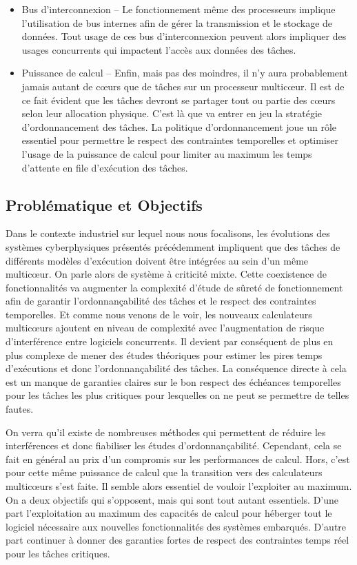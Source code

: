 \documentclass[french, a4paper, 11pt, twoside, pdftex]{StyleThese}
\begin{document}
\begin{itemize}
			\item Bus d'interconnexion -- 
				Le fonctionnement même des processeurs implique l'utilisation de bus internes afin de gérer la transmission et le stockage de données. Tout usage de ces bus d'interconnexion peuvent alors impliquer des usages concurrents qui impactent l'accès aux données des tâches.
			\item Puissance de calcul -- 
				Enfin, mais pas des moindres, il n'y aura probablement jamais autant de cœurs que de tâches sur un processeur multicœur. Il est de ce fait évident que les tâches devront se partager tout ou partie des cœurs selon leur allocation physique. C'est là que va entrer en jeu la stratégie d'ordonnancement des tâches. La politique d'ordonnancement joue un rôle essentiel pour permettre le respect des contraintes temporelles et optimiser l'usage de la puissance de calcul pour limiter au maximum les temps d'attente en file d'exécution des tâches. 
		\end{itemize}

\subsection{Problématique et Objectifs}
		Dans le contexte industriel sur lequel nous nous focalisons, les évolutions des systèmes cyberphysiques présentés précédemment impliquent que des tâches de différents modèles d'exécution doivent être intégrées au sein d'un même multicœur. On parle alors de système à criticité mixte. Cette coexistence de fonctionnalités va augmenter la complexité d'étude de sûreté de fonctionnement afin de garantir l'ordonnançabilité des tâches et le respect des contraintes temporelles. Et comme nous venons de le voir, les nouveaux calculateurs multicœurs ajoutent en niveau de complexité avec l'augmentation de risque d'interférence entre logiciels concurrents. Il devient par conséquent de plus en plus complexe de mener des études théoriques pour estimer les pires temps d'exécutions et donc l'ordonnançabilité des tâches. La conséquence directe à cela est un manque de garanties claires sur le bon respect des échéances temporelles pour les tâches les plus critiques pour lesquelles on ne peut se permettre de telles fautes.
		
		On verra qu'il existe de nombreuses méthodes qui permettent de réduire les interférences et donc fiabiliser les études d'ordonnançabilité. Cependant, cela se fait en général au prix d'un compromis sur les performances de calcul.
		Hors, c'est pour cette même puissance de calcul que la transition vers des calculateurs multicœurs s'est faite. Il semble alors essentiel de vouloir l'exploiter au maximum. On a deux objectifs qui s'opposent, mais qui sont tout autant essentiels. D'une part l'exploitation au maximum des capacités de calcul pour héberger tout le logiciel nécessaire aux nouvelles fonctionnalités des systèmes embarqués. D'autre part continuer à donner des garanties fortes de respect des contraintes temps réel pour les tâches critiques. 
		
\end{document}
